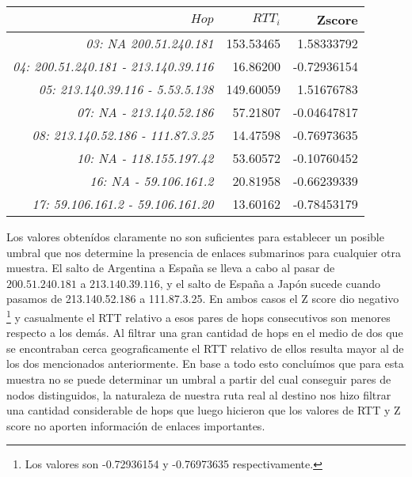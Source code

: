 \begin{table}[h]
    \centering
    \begin{tabular}{r | r | r}
        $Hop$ &$RTT_i$  &Zscore\\
        \hline\hline
\textit{03: NA  200.51.240.181}& 153.53465& 1.58333792\\
\textit{04: 200.51.240.181 - 213.140.39.116}&  16.86200& -0.72936154\\
\textit{05: 213.140.39.116 - 5.53.5.138}& 149.60059&  1.51676783\\
\textit{07: NA - 213.140.52.186}& 57.21807& -0.04647817\\
\textit{08: 213.140.52.186 - 111.87.3.25}&  14.47598& -0.76973635\\
\textit{10: NA - 118.155.197.42}&  53.60572& -0.10760452\\
\textit{16: NA - 59.106.161.2}& 20.81958& -0.66239339\\
\textit{17: 59.106.161.2 - 59.106.161.20}&  13.60162& -0.78453179\\
        \hline\hline
    \end{tabular}
    \bigskip
    \label{tab:tokyo_table}
\end{table}

\par Los valores obten\'idos claramente no son suficientes para establecer un posible umbral que nos determine la presencia de enlaces submarinos para cualquier otra muestra. El salto de Argentina a Espa\~na se lleva a cabo al pasar de $200.51.240.181$ a $213.140.39.116$, y el salto de Espa\~na a Jap\'on sucede cuando pasamos de 213.140.52.186 a 111.87.3.25. En ambos casos el Z score dio negativo \footnote{Los valores son -0.72936154 y -0.76973635 respectivamente.} y casualmente el RTT relativo a esos pares de hops consecutivos son menores respecto a los dem\'as. Al filtrar una gran cantidad de hops en el medio de dos que se encontraban cerca geograficamente el RTT relativo de ellos resulta mayor al de los dos mencionados anteriormente. \newline
En base a todo esto conclu\'imos que para esta muestra no se puede determinar un umbral a partir del cual conseguir pares de nodos distinguidos, la naturaleza de nuestra ruta real al destino nos hizo filtrar una cantidad considerable de hops que luego hicieron que los valores de RTT y Z score no aporten informaci\'on de enlaces importantes. 



